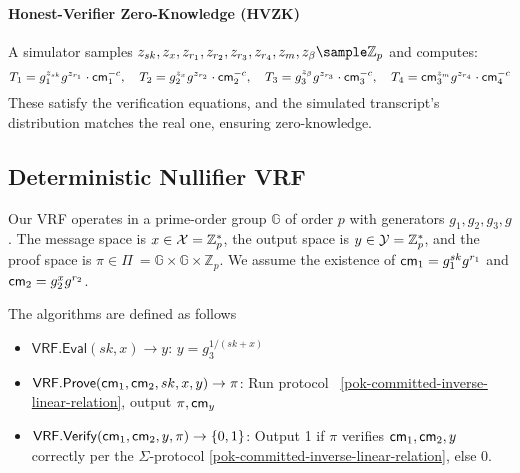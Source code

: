 \paragraph{Honest-Verifier Zero-Knowledge (HVZK)}
A simulator samples $z_{sk}, z_x, z_{r_1}, z_{r_2}, z_{r_3}, z_{r_4}, z_m, z_{\beta} \sample \mathbb{Z}_p$ and computes:
\[
T_1 = g_1^{z_{sk}} g^{z_{r_1}} \cdot \mathsf{cm}_1^{-c}, \quad T_2 = g_2^{z_x} g^{z_{r_2}} \cdot \mathsf{cm}_2^{-c}, \quad T_3 = g_3^{z_{\beta}} g^{z_{r_3}} \cdot \mathsf{cm}_3^{-c}, \quad T_4 = \mathsf{cm}_3^{z_m} g^{z_{r_4}} \cdot \mathsf{cm}_4^{-c}
\]
These satisfy the verification equations, and the simulated transcript’s distribution matches the real one, ensuring zero-knowledge.















\subsection{Deterministic Nullifier VRF}
\label{subsec:deterministic-nullifier}

Our VRF operates in a prime-order group $\mathbb{G}$ of order $p$ with generators $g_1, g_2, g_3, g$. The message space is $ x \in \mathcal{X} = \mathbb{Z}_p^*$, the output space is $y \in \mathcal{Y} = \mathbb{Z}_p^*$, and the proof space is $\pi \in \Pi\ = \mathbb{G} \times \mathbb{G} \times \mathbb{Z}_p$. We assume the existence of $\mathsf{cm}_1 = g_1^{sk} g^{r_1}$ and $\mathsf{cm}_2 = g_2^{x} g^{r_2}$.

The algorithms are defined as follows

\begin{itemize}
    \item $\mathsf{VRF.Eval}(sk, x) \to y$: $y = g_3^{1/(sk+x)}$
    
    \item $\mathsf{VRF.Prove}(\mathsf{cm}_1, \mathsf{cm}_2, sk, x, y) \to \pi$: Run protocol ~\ref{pok-committed-inverse-linear-relation}, output $\pi, \mathsf{cm}_y$
    
    \item $\mathsf{VRF.Verify}(\mathsf{cm}_1, \mathsf{cm}_2, y, \pi) \to \{0,1\}$: Output 1 if $\pi$ verifies $\mathsf{cm}_1, \mathsf{cm}_2, y$ correctly per the $\Sigma$-protocol \ref{pok-committed-inverse-linear-relation}, else 0.
\end{itemize}



